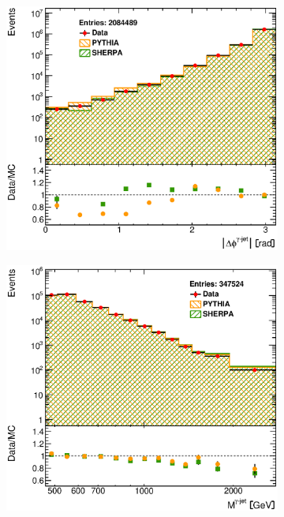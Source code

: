 \documentclass[12pt, twoside]{article}
\numberwithin{equation}{section}
\numberwithin{figure}{section}
\newenvironment{changemargin}[2]{%
\begin{list}{}{%
\setlength{\topsep}{0pt}%
\setlength{\leftmargin}{#1}%
\setlength{\rightmargin}{#2}%
\setlength{\listparindent}{\parindent}%
\setlength{\itemindent}{\parindent}%
\setlength{\parsep}{\parskip}%
}%
\item[]}{\end{list}}
\begin{document}
\begin{figure}
\begin{changemargin}{-1.0cm}{-0.75cm}
\begin{changemargin}{-0.75cm}{-1.0cm}
        \vspace{0.2cm}
        \begin{subfigure}[b]{0.37\textwidth}
            \includegraphics[width=\textwidth]{./images/Results(MUReweight)/DEF-107.eps}
            \subcaption{}
            \label{fig:MUReweightDeltaPhiPhotonJet}
        \end{subfigure}
        \begin{subfigure}[b]{0.37\textwidth}
            \includegraphics[width=\textwidth]{./images/Results(MUReweight)/DEF-108.eps}

\end{subfigure}
\end{changemargin}
\end{changemargin}
\end{figure}
\end{document}
